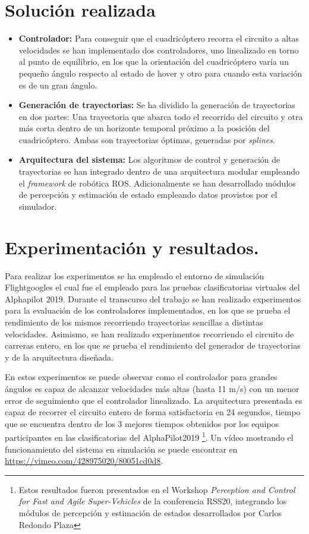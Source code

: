 \section*{Solución realizada}
\begin{itemize}
\item \textbf{Controlador:}
Para conseguir que el cuadricóptero recorra el circuito a altas velocidades se han implementado dos controladores, uno linealizado en torno al punto de equilibrio, en los que la orientación del cuadricóptero varía un pequeño ángulo respecto al estado de hover y otro para cuando esta variación es de un gran ángulo.

\item \textbf{Generación de trayectorias:} Se ha dividido la generación de trayectorias en dos partes:
Una trayectoria que abarca todo el recorrido del circuito y otra más corta dentro de un horizonte temporal próximo a la posición del cuadricóptero. Ambas son trayectorias óptimas, generadas por \textit{splines}.

\item \textbf{Arquitectura del sistema:} Los algoritmos de control y generación de trayectorias se han integrado dentro de una arquitectura modular empleando el \textit{framework} de robótica ROS. Adicionalmente se han desarrollado módulos de percepción y estimación de estado empleando datos provistos por el simulador.

\end{itemize}
	

\section*{Experimentación y resultados.}

Para realizar los experimentos se ha empleado el entorno de simulación Flightgoogles \cite{guerra2019flightgoggles}  el cual fue el empleado para las pruebas clasificatorias virtuales del Alphapilot 2019. Durante el transcurso del trabajo se han realizado experimentos para la evaluación de los controladores implementados, en los que se prueba el rendimiento de los mismos recorriendo trayectorias sencillas a distintas velocidades. Asimismo, se han realizado experimentos recorriendo el circuito de carreras entero, en los que se prueba el rendimiento del generador de trayectorias y de la arquitectura diseñada.

En estos experimentos se puede observar como el controlador para grandes ángulos es capaz de alcanzar velocidades más altas (hasta 11 m/s) con un menor error de seguimiento que el controlador linealizado. La arquitectura presentada es capaz de recorrer el circuito entero de forma satisfactoria en 24 segundos, tiempo que se encuentra dentro de los 3 mejores tiempos obtenidos por los equipos participantes en las clasificatorias del AlphaPilot2019 \cite{guerra2019flightgoggles} \footnote{Estos resultados fueron presentados en el Workshop  \textit{Perception and Control for Fast and Agile Super-Vehicles} de la conferencia RSS20, integrando los módulos de percepción y estimación de estados desarrollados por Carlos Redondo Plaza}. Un vídeo mostrando el funcionamiento del sistema en simulación se puede encontrar en \url{https://vimeo.com/428975020/80051cd0d8}.


